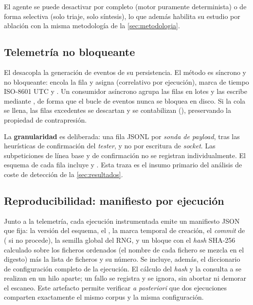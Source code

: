 El agente se puede desactivar por completo (motor puramente determinista) o de
forma selectiva (solo triaje, solo síntesis), lo que además habilita su estudio
por ablación con la misma metodología de la \cref{sec:metodologia}.

\subsection{Telemetría no bloqueante}
\label{sec:telemetria}

El  desacopla la generación de eventos de su
persistencia. El método  es síncrono y no bloqueante: encola la
fila y asigna  (correlativo por ejecución), marca de
tiempo ISO-8601 UTC y \rid. Un consumidor asíncrono agrupa las filas en lotes
y las escribe mediante , de forma que el bucle de
eventos nunca se bloquea en disco. Si la cola se llena, las filas excedentes se
descartan y se contabilizan (), preservando la propiedad de
contrapresión.

La \textbf{granularidad} es deliberada: una fila JSONL por \emph{sonda de
payload}, tras las heurísticas de confirmación del \emph{tester}, y no por
escritura de \emph{socket}. Las subpeticiones de línea base y de confirmación
no se registran individualmente. El esquema de cada fila incluye  y . Esta traza
es el insumo primario del análisis de coste de detección de la
\cref{sec:resultados}.

\subsection{Reproducibilidad: manifiesto por ejecución}
\label{sec:manifiesto}

Junto a la telemetría, cada ejecución instrumentada emite un manifiesto JSON
que fija: la versión del esquema, el \rid, la marca temporal de creación, el
\emph{commit} de  ( si no procede), la semilla global
del RNG, y un bloque  con el \emph{hash} SHA-256 calculado sobre
los ficheros  ordenados (el nombre de cada fichero se
mezcla en el digesto) más la lista de ficheros y su número. Se incluye, además,
el diccionario de configuración completo de la ejecución. El cálculo del
\emph{hash} y la consulta a  se realizan en un hilo aparte; un fallo
se registra y se ignora, sin abortar ni demorar el escaneo. Este artefacto
permite verificar \emph{a posteriori} que dos ejecuciones comparten exactamente
el mismo corpus y la misma configuración.
